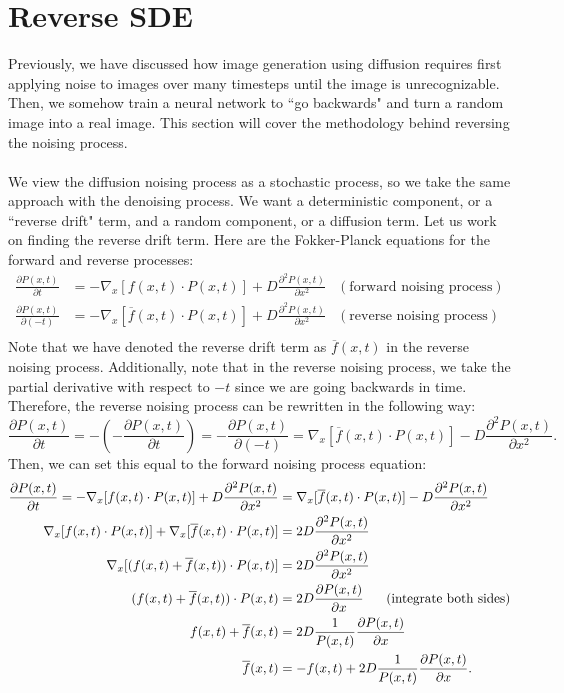 \documentclass{article}
\begin{document}

\section{Reverse SDE}
Previously, we have discussed how image generation using diffusion requires first applying noise to images over many timesteps until the image is unrecognizable. Then, we somehow train a neural network to ``go backwards" and turn a random image into a real image. This section will cover the methodology behind reversing the noising process. 
\\
\\
We view the diffusion noising process as a stochastic process, so we take the same approach with the denoising process. We want a deterministic component, or a ``reverse drift" term, and a random component, or a diffusion term. Let us work on finding the reverse drift term. Here are the Fokker-Planck equations for the forward and reverse processes: 
\begin{align*}
    \frac{\partial P(x,t)}{\partial t}&=-\nabla_x[f(x,t)\cdot P(x,t)]+D\frac{\partial ^2 P(x,t)}{\partial x^2}&(\text{forward noising process})\\
    \frac{\partial P(x,t)}{\partial (-t)}&=-\nabla_x[\overline{f}(x,t)\cdot P(x,t)]+D\frac{\partial ^2 P(x,t)}{\partial x^2}&(\text{reverse noising process})\\
\end{align*}
Note that we have denoted the reverse drift term as $\overline{f}(x,t)$ in the reverse noising process. Additionally, note that in the reverse noising process, we take the partial derivative with respect to $-t$ since we are going backwards in time. Therefore, the reverse noising process can be rewritten in the following way:
\[\frac{\partial P(x,t)}{\partial t}=-\left(-\frac{\partial P(x,t)}{\partial t}\right)=-\frac{\partial P(x,t)}{\partial (-t)}=\nabla_x[\overline{f}(x,t)\cdot P(x,t)]-D\frac{\partial ^2 P(x,t)}{\partial x^2}.\]
Then, we can set this equal to the forward noising process equation:
\begin{align*}
    \frac{\partial P(x,t)}{\partial t}=-\nabla_x[f(x,t)\cdot P(x,t)]+D\frac{\partial ^2 P(x,t)}{\partial x^2}&=\nabla_x[\overline{f}(x,t)\cdot P(x,t)]-D\frac{\partial ^2 P(x,t)}{\partial x^2}\\
    \nabla_x[f(x,t)\cdot P(x,t)]+\nabla_x[\overline{f}(x,t)\cdot P(x,t)]&=2D\frac{\partial ^2 P(x,t)}{\partial x^2}\\
    \nabla_x[(f(x,t)+\overline{f}(x,t))\cdot P(x,t)]&=2D\frac{\partial ^2 P(x,t)}{\partial x^2}\\
    (f(x,t)+\overline{f}(x,t))\cdot P(x,t)&=2D\frac{\partial  P(x,t)}{\partial x}\hspace{6mm} \text{(integrate both sides)}\\
    f(x,t)+\overline{f}(x,t)&=2D\frac{1}{P(x,t)}\frac{\partial  P(x,t)}{\partial x}\\
    \overline{f}(x,t)&=-f(x,t)+2D\frac{1}{P(x,t)}\frac{\partial  P(x,t)}{\partial x}.
\end{align*}
\end{document}
